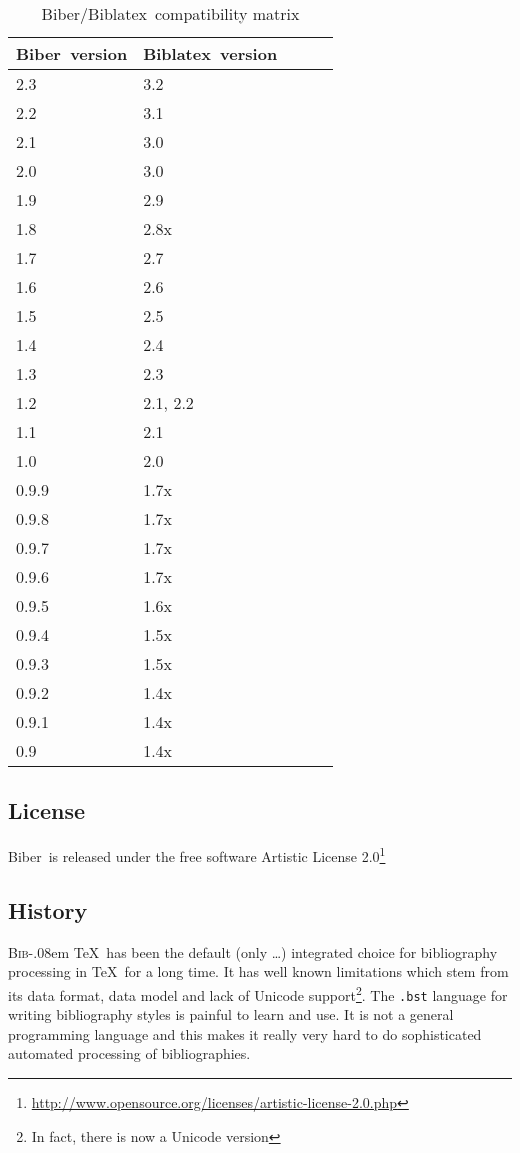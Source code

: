 \documentclass{ltxdockit}
\def\BibTeX{\textsc{Bib}\kern-.08em \TeX}
\newcommand*{\biber}{Biber\xspace}
\newcommand*{\biblatex}{Biblatex\xspace}
\begin{document}
\begin{table}
\begin{center}
\small
\begin{tabular}{lllll}
\toprule
\biber\ version & \biblatex\ version\\
\midrule
2.3 & 3.2\\
2.2 & 3.1\\
2.1 & 3.0\\
2.0 & 3.0\\
1.9 & 2.9\\
1.8 & 2.8x\\
1.7 & 2.7\\
1.6 & 2.6\\
1.5 & 2.5\\
1.4 & 2.4\\
1.3 & 2.3\\
1.2 & 2.1, 2.2\\
1.1 & 2.1\\
1.0 & 2.0\\
0.9.9 & 1.7x\\
0.9.8 & 1.7x\\
0.9.7 & 1.7x\\
0.9.6 & 1.7x\\
0.9.5 & 1.6x\\
0.9.4 & 1.5x\\
0.9.3 & 1.5x\\
0.9.2 & 1.4x\\
0.9.1 & 1.4x\\
0.9 & 1.4x\\
\bottomrule
\end{tabular}
\end{center}
\caption{\biber/\biblatex\ compatibility matrix}
\label{tab:compat}
\end{table}

\subsection{License}

\biber\ is released under the free software Artistic License 2.0\footnote{\url{http://www.opensource.org/licenses/artistic-license-2.0.php}}

\subsection{History}

\BibTeX\ has been the default (only \ldots) integrated choice for
bibliography processing in \TeX\ for a long time. It has well known
limitations which stem from its data format, data model and lack of Unicode
support\footnote{In fact, there is now a Unicode version}. The
\verb+.bst+ language for writing bibliography styles is painful to learn
and use. It is not a general programming language and this makes it really
very hard to do sophisticated automated processing of bibliographies.
\end{document}
